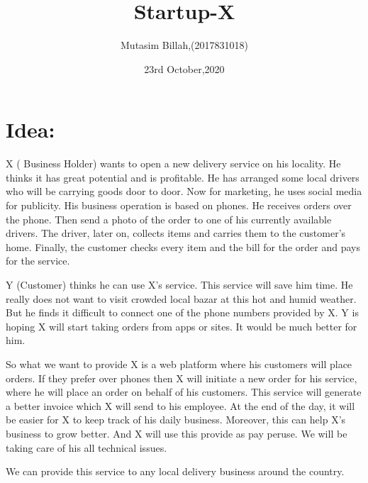 \documentclass[13pt]{extarticle}
\title{Startup-X}
\author{Mutasim Billah,(2017831018)}
\date{23rd October,2020}
\begin{document}
\maketitle{}
\section*{\textbf{Idea:} }

\quad X ( Business Holder) wants to open a new delivery service on his locality. He thinks it has great potential and is profitable. He has arranged some local drivers who will be carrying goods door to door. Now for marketing, he uses social media for publicity. His business operation is based on phones. He receives orders over the phone. Then send a photo of the order to one of his currently available drivers. The driver, later on, collects items and carries them to the customer’s home. Finally, the customer checks every item and the bill for the order and pays for the service. 

Y (Customer) thinks he can use X’s service. This service will save him time. He really does not want to visit crowded local bazar at this hot and humid weather. But he finds it difficult to connect one of the phone numbers provided by X. Y is hoping X will start taking orders from apps or sites. It would be much better for him. 

 So what we want to provide X is a web platform where his customers will place orders. If they prefer over phones then X will initiate a new order for his service, where he will place an order on behalf of his customers. This service will generate a better invoice which X will send to his employee. At the end of the day, it will be easier for X to keep track of his daily business. Moreover, this can help X’s business to grow better. And X will use this provide as pay peruse. We will be taking care of his all technical issues. 

We can provide this service to any local delivery business around the country.
\end{document}
